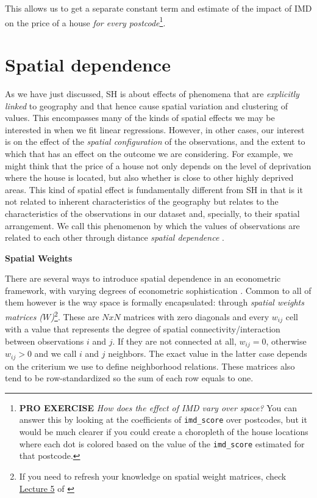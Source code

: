 \documentclass[
]{book}
\begin{document}
This allows us to get a separate constant term and estimate of the impact of IMD on the price of a house \emph{for every postcode}\footnote{\textbf{PRO EXERCISE} \emph{How does the effect of IMD vary over space?} You can answer this by looking at the coefficients of \texttt{imd\_score} over postcodes, but it would be much clearer if you could create a choropleth of the house locations where each dot is colored based on the value of the \texttt{imd\_score} estimated for that postcode.}.

\hypertarget{spatial-dependence}{%
\section{Spatial dependence}\label{spatial-dependence}}

As we have just discussed, SH is about effects of phenomena that are \emph{explicitly linked} to geography and that hence cause spatial variation and clustering of values. This encompasses many of the kinds of spatial effects we may be interested in when we fit linear regressions. However, in other cases, our interest is on the effect of the \emph{spatial configuration} of the observations, and the extent to which that has an effect on the outcome we are considering. For example, we might think that the price of a house not only depends on the level of deprivation where the house is located, but also whether is close to other highly deprived areas. This kind of spatial effect is fundamentally different from SH in that is it not related to inherent characteristics of the geography but relates to the characteristics of the observations in our dataset and, specially, to their spatial arrangement. We call this phenomenon by which the values of observations are related to each other through distance \emph{spatial dependence} \citep{anselin1988spatial}.

\textbf{Spatial Weights}

There are several ways to introduce spatial dependence in an econometric framework, with varying degrees of econometric sophistication \citep[see][ for a good overview]{anselin2003spatial}. Common to all of them however is the way space is formally encapsulated: through \emph{spatial weights matrices (\(W\))}\footnote{If you need to refresh your knowledge on spatial weight matrices, check \href{http://darribas.org/gds15/notes/Class_05.html}{Lecture 5} of \citet{darribas_gds15}}. These are \(NxN\) matrices with zero diagonals and every \(w_{ij}\) cell with a value that represents the degree of spatial connectivity/interaction between observations \(i\) and \(j\). If they are not connected at all, \(w_{ij}=0\), otherwise \(w_{ij}>0\) and we call \(i\) and \(j\) neighbors. The exact value in the latter case depends on the criterium we use to define neighborhood relations. These matrices also tend to be row-standardized so the sum of each row equals to one.
\end{document}
